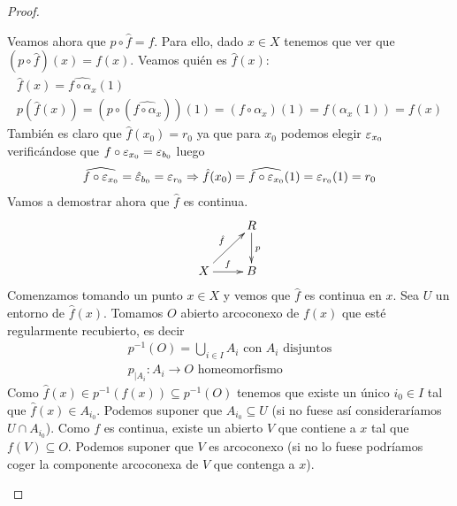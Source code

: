 \begin{teo}
\begin{proof}
\begin{itemize}
            Veamos ahora que $p\circ \hat{f}=f$. Para ello, dado $x\in X$ tenemos que ver que $(p\circ \hat{f})(x) = f(x)$. Veamos quién es $\hat{f}(x)$:
            \begin{gather*}
                \hat{f}(x) = \widehat{f\circ \alpha_x}(1)\\
                p(\hat{f}(x)) = (p\circ (\widehat{f\circ \alpha_x}))(1) = (f\circ \alpha_x)(1) = f(\alpha_x(1)) = f(x)
            \end{gather*}
            También es claro que $\hat{f}(x_0)=r_0$ ya que para $x_0$ podemos elegir $\varepsilon_{x_0}$ verificándose que $f\circ \varepsilon_{x_0} = \varepsilon_{b_0}$ luego 
            \begin{gather*}
                \widehat{f\circ \varepsilon_{x_0}} = \hat{\varepsilon}_{b_0} = \varepsilon_{r_0} \Rightarrow \hat{f}(x_0) = \widehat{f\circ \varepsilon_{x_0}}(1) = \varepsilon_{r_0}(1) = r_0
            \end{gather*}
            Vamos a demostrar ahora que $\hat{f}$ es continua. 
            \begin{gather*}
                \xymatrix{
                    & R \ar[d]^p\\
                    X \ar[ur]^{\hat{f}} \ar[r]^f & B
                }
            \end{gather*}
            Comenzamos tomando un punto $x\in X$ y vemos que $\hat{f}$ es continua en $x$. Sea $U$ un entorno de $\hat{f}(x)$. Tomamos $O$ abierto arcoconexo de $f(x)$ que esté regularmente recubierto, es decir
            \begin{gather*}
                p^{-1}(O) = \bigcup\limits_{i\in I} A_i \text{ con } A_i \text{ disjuntos}\\
                p_{|A_i} : A_i \to O \text{ homeomorfismo}
            \end{gather*}
            Como $\hat{f}(x)\in p^{-1}(f(x))\subseteq p^{-1}(O)$ tenemos que existe un único $i_0\in I$ tal que $\hat{f}(x)\in A_{i_0}$. Podemos suponer que $A_{i_0}\subseteq U$ (si no fuese así consideraríamos $U\cap A_{i_0}$). Como $f$ es continua, existe un abierto $V$ que contiene a $x$ tal que $f(V)\subseteq O$. Podemos suponer que $V$ es arcoconexo (si no lo fuese podríamos coger la componente arcoconexa de $V$ que contenga a $x$).\\
            

\end{itemize}
\end{proof}
\end{teo}
